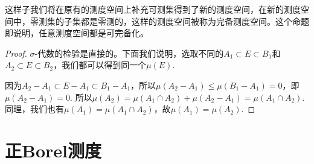 这样子我们将在原有的测度空间上补充可测集得到了新的测度空间，在新的测度空间中，零测集的子集都是零测的，这样的测度空间被称为完备测度空间。这个命题即说明，任意测度空间都是可完备化。

\begin{proof}
$\sigma$-代数的检验是直接的。下面我们说明，选取不同的$A_1\subset E\subset B_1$和$A_2\subset E\subset B_2$，我们都可以得到同一个$\mu(E)$.

因为$A_2-A_1\subset E-A_1\subset B_1-A_1$，所以$\mu(A_2-A_1)\leq \mu(B_1-A_1)=0$，即$\mu(A_2-A_1)=0$. 所以$\mu(A_2)=\mu(A_1\cap A_2)+\mu(A_2-A_1)=\mu(A_1\cap A_2)$. 同理，我们也有$\mu(A_1)=\mu(A_1\cap A_2)$，故$\mu(A_1)=\mu(A_2)$.
\end{proof}


\section{正Borel测度}